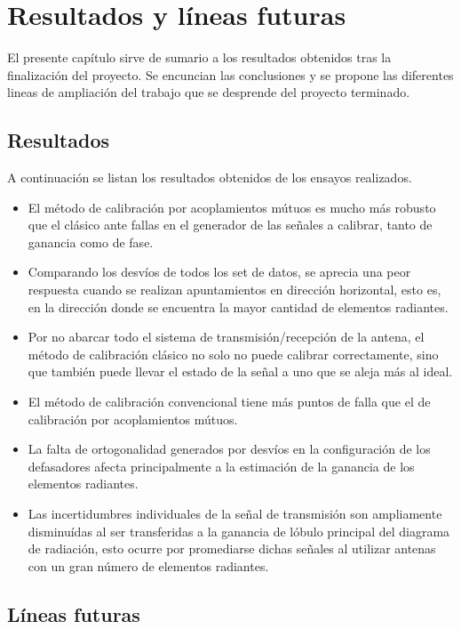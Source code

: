 \chapter{Resultados y líneas futuras}

El presente capítulo sirve de sumario a los resultados obtenidos tras la finalización del proyecto. Se encuncian las 
conclusiones y se propone las diferentes lineas de ampliación del trabajo que se desprende del proyecto terminado.

\section{Resultados}

A continuación se listan los resultados obtenidos de los ensayos realizados.
\begin{itemize}
	\item El método de calibración por acoplamientos mútuos es mucho más robusto que el clásico ante fallas en el generador 
		de las señales a calibrar, tanto de ganancia como de fase.
	\item Comparando los desvíos de todos los set de datos, se aprecia una peor respuesta cuando se realizan apuntamientos 
		en dirección horizontal, esto es, en la dirección donde se encuentra la mayor cantidad de elementos radiantes.
	\item Por no abarcar todo el sistema de transmisión/recepción de la antena, el método de calibración clásico no solo no 
		puede calibrar correctamente, sino que también puede llevar el estado de la señal a uno que se aleja más al ideal.
	\item El método de calibración convencional tiene más puntos de falla que el de calibración por acoplamientos mútuos.
	\item La falta de ortogonalidad generados por desvíos en la configuración de los defasadores afecta principalmente a la 
		estimación de la ganancia de los elementos radiantes.
	\item Las incertidumbres individuales de la señal de transmisión son ampliamente disminuídas al ser transferidas a la 
		ganancia de lóbulo principal del diagrama de radiación, esto ocurre por promediarse dichas señales al utilizar antenas 
		con un gran número de elementos radiantes.
\end{itemize}

\section{Líneas futuras}

